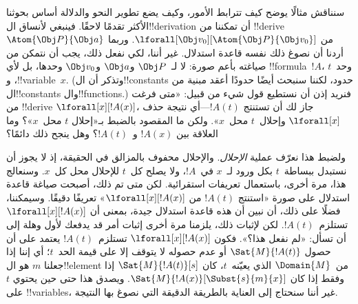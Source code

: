 \documentclass[../../../include/open-logic-section]{subfiles}
\begin{document}


سنناقش مثالًا يوضح كيف تترابط الأمور، وكيف يضع تطوير النحو والدلالة
أساس بحوثنا الأكثر تقدمًا لاحقًا. فينبغي لأنساق ال!!{derivation} أن
تمكننا من !!{derive} $\Atom{\Obj P}{\Obj a}$ من
$\lforall[\Obj v_0][\Atom{\Obj P}{\Obj v_0}]$. وربما أردنا أن نصوغ
ذلك نفسه قاعدة استدلال. غير أننا، لكي نفعل ذلك، يجب أن نتمكن من صياغته
بأعم صورة: لا لـ~$\Obj P$ و$\Obj a$ و$\Obj v_0$ وحدها، بل لأي
!!{formula}~$!A$، وحد~$t$، و!!{variable}~$x$. (وتذكر أن
ال!!{constant}s حدود، لكننا سنبحث أيضًا حدودًا أعقد مبنية من
ال!!{constant}s وال!!{function}s.) فنريد إذن أن نستطيع قول شيء من
قبيل: «متى فرغت من !!{derive} $\lforall[x][!A(x)]$، جاز لك أن تستنتج
$!A(t)$---أي نتيجة حذف $\lforall[x]$ وإحلال~$t$ محل~$x$». ولكن ما
المقصود بالضبط بـ«إحلال $t$ محل~$x$»؟ وما العلاقة بين $!A(x)$
و~$!A(t)$؟ وهل ينجح ذلك دائمًا؟

ولضبط هذا نعرّف عملية \emph{الإحلال}. والإحلال محفوف بالمزالق في
الحقيقة، إذ لا يجوز أن نستبدل ببساطة~$t$ بكل ورود لـ~$x$ في~$!A$،
ولا يصلح كل~$t$ للإحلال محل كل~$x$. وسنعالج هذا، مرة أخرى، باستعمال
تعريفات استقرائية. لكن متى تم ذلك، أصبحت صياغة قاعدة استدلال على صورة
«استنتج $!A(t)$ من $\lforall[x][!A(x)]$» تعريفًا دقيقًا. وسيمكننا،
فضلًا على ذلك، أن نبين أن هذه قاعدة استدلال جيدة، بمعنى أن
$\lforall[x][!A(x)]$ تستلزم~$!A(t)$. لكن لإثبات ذلك، يلزمنا مرة أخرى
إثبات أمر قد يدفعك لأول وهلة إلى أن تسأل: «لم نفعل هذا؟». فكون
$\lforall[x][!A(x)]$ تستلزم~$!A(t)$ يعتمد على أن حصول
$\Sat{M}{!A(t)}$ أو عدم حصوله لا يتوقف إلا على قيمة الحد~$t$؛ أي إننا
إذا جعلنا $m$ هو ال!!{element} من~$\Domain{M}$ الذي يعيّنه~$t$، كان
$\Sat{M}{!A(t)}[s]$ إذا وفقط إذا كان
$\Sat{M}{!A(x)}[\Subst{s}{m}{x}]$. ويصدق هذا حتى حين يحتوي $t$ على
!!{variable}s، غير أننا سنحتاج إلى العناية بالطريقة الدقيقة التي نصوغ
بها النتيجة.
\end{document}
